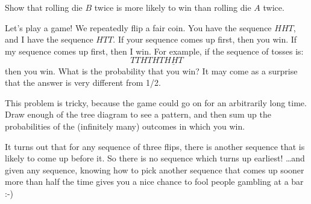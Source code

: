 \documentclass[12pt,twoside]{article}
\begin{document}
\begin{problem}{15}
Show that rolling die $B$ twice is more likely to win than rolling die $A$ twice.

\eparts 

\end{problem}




\begin{problem}{14}
Let's play a game!  We repeatedly flip a fair coin.  You have the
sequence $HHT$, and I have the sequence $HTT$.  If your sequence comes
up first, then you win.  If my sequence comes up first, then I win.
For example, if the sequence of tosses is:
\[
TTHTHT\underline{HHT}
\]
then you win.  What is the probability that you win?  It may come as a
surprise that the answer is very different from 1/2.

This problem is tricky, because the game could go on for an arbitrarily
long time.  Draw enough of the tree diagram to see a pattern, and then sum
up the probabilities of the (infinitely many) outcomes in which you win.

It turns out that for any sequence of three flips, there is another
sequence that is likely to come up before it.  So there is no sequence
which turns up earliest! \dots and given any sequence, knowing how to pick
another sequence that comes up sooner more than half the time gives you a
nice chance to fool people gambling at a bar :-)


\end{problem}
\end{document}
